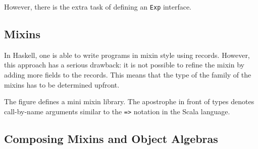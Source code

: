 However, there is the extra task of defining an \lstinline{Exp} interface.



\subsection{Mixins}



In Haskell, one is able to write programs in mixin style using records. However,
this approach has a serious drawback: it is not possible to refine the mixin by
adding more fields to the records. This means that the type of the family of the
mixins has to be determined upfront.

The figure defines a mini mixin library. The apostrophe in front of types
denotes call-by-name arguments similar to the \lstinline{=>} notation in the
Scala language.

\subsection{Composing Mixins and Object Algebras}
